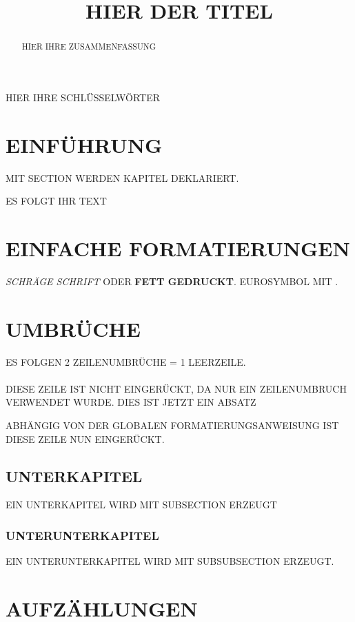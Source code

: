 \documentclass[conference,compsocl]{IEEEtran}
\title{HIER DER TITEL}
\author{
  \IEEEauthorblockN{ERSTER AUTOR}
  \IEEEauthorblockA{KONAKT\\
    DATEN\\
    MAIL?}
  \and
  \IEEEauthorblockN{ZWEITER AUTOR}
  \IEEEauthorblockA{KONAKT\\
    DATEN\\
    MAIL?}}
\begin{document}
\maketitle

\begin{abstract}
  HIER IHRE ZUSAMMENFASSUNG
\end{abstract}

\begin{IEEEkeywords}
  HIER IHRE SCHLÜSSELWÖRTER
\end{IEEEkeywords}

\IEEEpeerreviewmaketitle

\section{EINFÜHRUNG}
MIT SECTION WERDEN KAPITEL DEKLARIERT.

ES FOLGT IHR TEXT

\section{EINFACHE FORMATIERUNGEN}
\textit{SCHRÄGE SCHRIFT} ODER \textbf{FETT GEDRUCKT}. EUROSYMBOL MIT \EUR.

\section{UMBRÜCHE}
ES FOLGEN 2 ZEILENUMBRÜCHE = 1 LEERZEILE.\\
\\
DIESE ZEILE IST NICHT EINGERÜCKT, DA NUR EIN ZEILENUMBRUCH VERWENDET
WURDE. DIES IST JETZT EIN ABSATZ\par
ABHÄNGIG VON DER GLOBALEN FORMATIERUNGSANWEISUNG IST DIESE ZEILE NUN
EINGERÜCKT.



\subsection{UNTERKAPITEL}
EIN UNTERKAPITEL WIRD MIT SUBSECTION ERZEUGT

\subsubsection{UNTERUNTERKAPITEL}
\label{sec:unterunterkapitel} %
EIN UNTERUNTERKAPITEL WIRD MIT SUBSUBSECTION ERZEUGT.

\section{AUFZÄHLUNGEN}
\label{sec:aufzaehlungen} %
\end{document}
